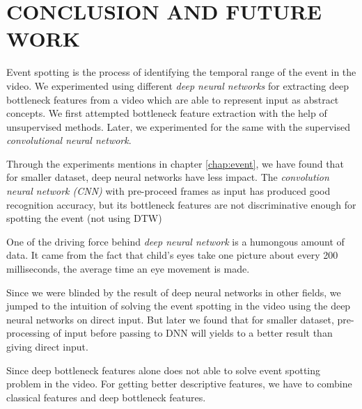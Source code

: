 \chapter{CONCLUSION AND FUTURE WORK} 
\label{chap:concl}
Event spotting is the process of identifying the temporal range of the event in the video. We experimented using  different \textit{deep neural networks} for extracting deep bottleneck features from a video which are able to represent input as abstract concepts. We first attempted  bottleneck feature extraction with the help of unsupervised methods. Later, we experimented for the same with the supervised \textit{convolutional neural network}.

Through the experiments mentions in chapter \ref{chap:event}, we have found that for smaller dataset, deep neural networks have less impact.  The \textit{convolution neural network (CNN)} with pre-proceed frames as input has produced good recognition accuracy, but its bottleneck features are not discriminative enough for spotting the event (not using DTW)

One of the driving force behind \textit{deep neural network} is a humongous amount of data. It came from the fact that child's eyes take one picture about every 200 milliseconds, the average time an eye movement is made. 

Since we were blinded by the result of deep neural networks in other fields, we jumped to the intuition of solving  the event spotting in the video using the deep neural networks on direct input. But later we found that for smaller dataset, pre-processing of input before passing to DNN will yields to a better result than giving direct input.

Since deep bottleneck features alone does not able to solve event spotting problem in the video. For getting better descriptive features, we have to combine classical features and deep bottleneck features.  

